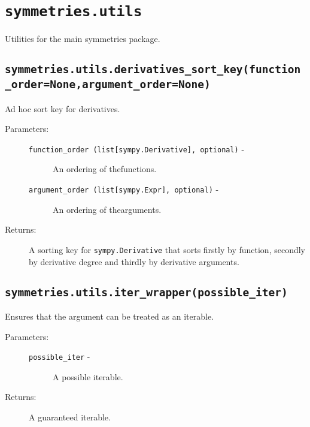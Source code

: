 \section*{\lstinline{symmetries.utils}}

Utilities for the main symmetries package.

\subsection*{\lstinline{symmetries.utils.derivatives_sort_key(function_order=None,}\newline\lstinline{argument_order=None)}}

   Ad hoc sort key for derivatives.

   \begin{description}
      \item[Parameters:] \leavevmode
        \begin{description}
            \item[\lstinline{function_order (list[sympy.Derivative], optional)} -] An ordering of the\newline functions.
            \item[\lstinline{argument_order (list[sympy.Expr], optional)} -] An ordering of the\newline arguments.
        \end{description}
      \item[Returns:] A sorting key for \lstinline{sympy.Derivative} that sorts firstly by function, secondly by derivative degree and thirdly by derivative arguments.
   \end{description}

\subsection*{\lstinline{symmetries.utils.iter_wrapper(possible_iter)}}

   Ensures that the argument can be treated as an iterable.

   \begin{description}
      \item[Parameters:] \leavevmode
        \begin{description}
            \item[\lstinline{possible_iter} -] A possible iterable.
        \end{description}
      \item[Returns:] A guaranteed iterable.
   \end{description}      


